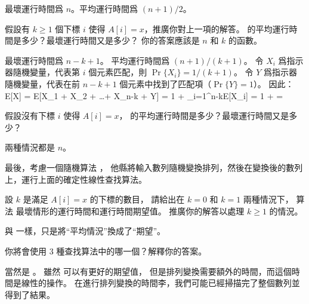 \startANSWER
最壞運行時間爲 $n$。平均運行時間爲 $(n+1)/2$。
\stopANSWER

\startigBase[continue]
\item 假設有 $k\ge 1$ 個下標 $i$ 使得 $A[i] = x$，推廣你對上一項的解答。
 的平均運行時間是多少？最壞運行時間又是多少？
你的答案應該是 $n$ 和 $k$ 的函數。
\stopigBase

\startANSWER
最壞運行時間爲 $n-k+1$。
平均運行時間爲 $(n+1)/(k+1)$。
令 $X_i$ 爲指示器隨機變量，代表第 $i$ 個元素匹配，則 $\Pr\{X_i\} = 1/(k+1)$。
令 $Y$ 爲指示器隨機變量，代表在前 $n-k+1$ 個元素中找到了匹配項（$\Pr{\{Y\}}=1$）。
因此：
\startsplitformula\startmathalignment
\NC E[X] \NC= E[X_1 + X_2 + \ldots + X_{n-k} + Y] \NR
\NC      \NC= 1 + \sum_{i=1}^{n-k}E[X_i] \NR
\NC      \NC= 1 +  \NR
\NC      \NC=  \NR
\stopmathalignment\stopsplitformula
\stopANSWER

\startigBase[continue]
\item 假設沒有下標 $i$ 使得 $A[i] = x$，
 的平均運行時間是多少？最壞運行時間又是多少？
\stopigBase

\startANSWER
兩種情況都是 $n$。
\stopANSWER

最後，考慮一個隨機算法 ，
他縣將輸入數列隨機變換排列，然後在變換後的數列上，運行上面的確定性線性查找算法。
\startigBase[continue]
\item 設 $k$ 是滿足 $A[i] = x$ 的下標的數目，
請給出在 $k=0$ 和 $k=1$ 兩種情況下，
算法  最壞情形的運行時間和運行時間期望值。
推廣你的解答以處理 $k\ge 1$ 的情況。
\stopigBase

\startANSWER
與  一樣，只是將“平均情況”換成了“期望”。
\stopANSWER

\startigBase[continue]
\item 你將會使用 3 種查找算法中的哪一個？解釋你的答案。
\stopigBase

\startANSWER
當然是 。
雖然  可以有更好的期望值，
但是排列變換需要額外的時間，而這個時間是線性的操作。
在進行排列變換的時間李，我們可能已經掃描完了整個數列並得到了結果。
\stopANSWER

\stopPROBLEM

\stopsubject
